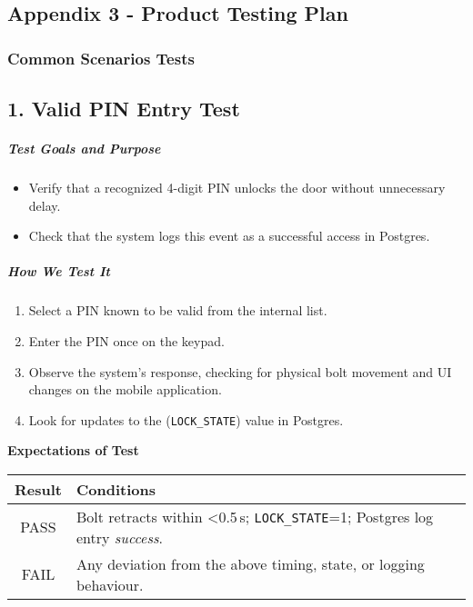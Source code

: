\newpage
\begin{samepage}
    \subsection{Appendix 3 - Product Testing Plan}
    \subsubsection{Common Scenarios Tests}
    \subsection*{1. Valid PIN Entry Test}
    \subparagraph{Test Goals and Purpose}
    \begin{itemize}
        \item Verify that a recognized 4-digit PIN unlocks the door without unnecessary delay.
        \item Check that the system logs this event as a successful access in Postgres.
    \end{itemize}
    \subparagraph{How We Test It}
    \begin{enumerate}
        \item Select a PIN known to be valid from the internal list.
        \item Enter the PIN once on the keypad.
        \item Observe the system's response, checking for physical bolt movement and UI changes on the mobile application.
        \item Look for updates to the (\texttt{LOCK\_STATE}) value in Postgres.
    \end{enumerate}
    
    \textbf{Expectations of Test}
    \begin{center}
    \begin{tabular}{|c|p{10cm}|}
      \hline
      \textbf{Result} & \textbf{Conditions} \\
      \hline
      PASS & Bolt retracts within \textless{}0.5\,s; \texttt{LOCK\_STATE}=1; Postgres log entry \emph{success}. \\
      \hline
      FAIL & Any deviation from the above timing, state, or logging behaviour. \\
      \hline
    \end{tabular}
    \end{center}
\end{samepage}


